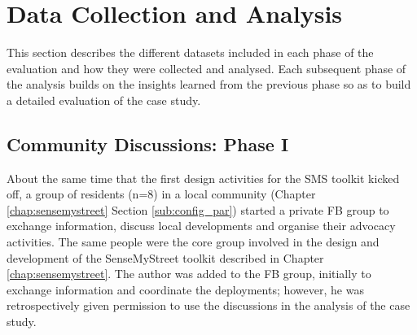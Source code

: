 \section{Data Collection and Analysis}
This section describes the different datasets included in each phase of the evaluation and how they were collected and analysed. Each subsequent phase of the analysis builds on the insights learned from the previous phase so as to build a detailed evaluation of the case study.

\subsection[Community Discussions]{Community Discussions: Phase I}
About the same time that the first design activities for the SMS toolkit kicked off, a group of residents (n=8) in a local community (Chapter \ref{chap:sensemystreet} Section \ref{sub:config_par}) started a private FB group to exchange information, discuss local developments and organise their advocacy activities. The same people were the core group involved in the design and development of the SenseMyStreet toolkit described in Chapter \ref{chap:sensemystreet}. The author was added to the FB group, initially to exchange information and coordinate the deployments; however, he was retrospectively given permission to use the discussions in the analysis of the case study.


